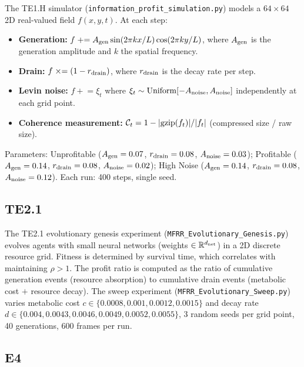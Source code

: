 \documentclass[11pt,twocolumn]{article}
\theoremstyle{remark}
\begin{document}
The TE1.H simulator (\texttt{information\_profit\_simulation.py})
models a $64\times64$ 2D real-valued field $f(x,y,t)$. At each step:
\begin{itemize}
  \item \textbf{Generation:} $f \mathrel{+}= A_{\rm gen} \sin(2\pi k
    x / L) \cos(2\pi k y / L)$, where $A_{\rm gen}$ is the generation
    amplitude and $k$ the spatial frequency.
  \item \textbf{Drain:} $f \mathrel{\times}= (1 - r_{\rm drain})$,
    where $r_{\rm drain}$ is the decay rate per step.
  \item \textbf{Levin noise:} $f \mathrel{+}= \xi_t$ where $\xi_t
    \sim \mathrm{Uniform}[-A_{\rm noise}, A_{\rm noise}]$ independently
    at each grid point.
  \item \textbf{Coherence measurement:} $\mathcal{C}_t = 1 -
    |{\rm gzip}(f_t)| / |f_t|$ (compressed size / raw size).
\end{itemize}
Parameters: Unprofitable ($A_{\rm gen}=0.07$, $r_{\rm drain}=0.08$,
$A_{\rm noise}=0.03$); Profitable ($A_{\rm gen}=0.14$,
$r_{\rm drain}=0.08$, $A_{\rm noise}=0.02$); High Noise
($A_{\rm gen}=0.14$, $r_{\rm drain}=0.08$, $A_{\rm noise}=0.12$).
Each run: 400 steps, single seed.

\subsection{TE2.1}
\label{app:sim:te21}

The TE2.1 evolutionary genesis experiment
(\texttt{MFRR\_Evolutionary\_Genesis.py}) evolves agents with
small neural networks (weights $\in \mathbb{R}^{d_{\rm net}}$)
in a 2D discrete resource grid. Fitness is determined by survival
time, which correlates with maintaining $\rho > 1$. The profit
ratio is computed as the ratio of cumulative generation events
(resource absorption) to cumulative drain events (metabolic cost
$+$ resource decay). The sweep experiment
(\texttt{MFRR\_Evolutionary\_Sweep.py}) varies metabolic cost
$c \in \{0.0008, 0.001, 0.0012, 0.0015\}$ and decay rate
$d \in \{0.004, 0.0043, 0.0046, 0.0049, 0.0052, 0.0055\}$,
3 random seeds per grid point, 40 generations, 600 frames per run.

\subsection{E4}
\label{app:sim:e4}
\end{document}
